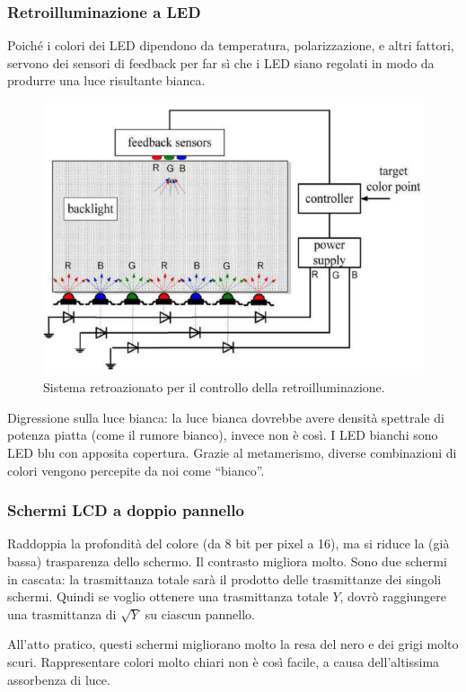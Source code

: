 \documentclass[a4paper,11pt]{article}
\begin{document}
\subsubsection{Retroilluminazione a LED}
Poiché i colori dei LED dipendono da temperatura, polarizzazione, e altri fattori, servono dei sensori di feedback per far
sì che i LED siano regolati in modo da produrre una luce risultante bianca.

\renewcommand{\thefigure}{4.10}
\begin{figure}[!h]
  \centering
    \includegraphics[scale=0.4]{images/4/feedback.png}
    \caption{Sistema retroazionato per il controllo della retroilluminazione.}
\end{figure}

Digressione sulla luce bianca: la luce bianca dovrebbe avere densità spettrale di potenza piatta (come il rumore bianco), invece non è così. I LED bianchi sono LED blu con apposita copertura.
Grazie al metamerismo, diverse combinazioni di colori vengono percepite da noi come ``bianco''.

\subsubsection{Schermi LCD a doppio pannello}
Raddoppia la profondità del colore (da 8 bit per pixel a 16), ma si riduce la (già bassa) trasparenza dello schermo.
Il contrasto migliora molto. Sono due schermi in cascata: la trasmittanza totale sarà il prodotto delle
trasmittanze dei singoli schermi. Quindi se voglio ottenere una trasmittanza totale $Y$, dovrò raggiungere una trasmittanza di $\sqrt{Y}$ su ciascun pannello.
\par
All'atto pratico, questi schermi migliorano molto la resa del nero e dei grigi molto scuri. Rappresentare colori molto chiari non è così facile, a causa dell'altissima assorbenza di luce.
\end{document}
